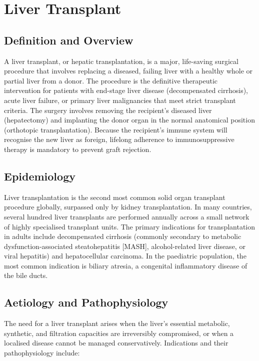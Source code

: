 \chapter{Liver Transplant}

\section*{Definition and Overview}
A liver transplant, or hepatic transplantation, is a major, life-saving surgical procedure that involves replacing a diseased, failing liver with a healthy whole or partial liver from a donor. The procedure is the definitive therapeutic intervention for patients with end-stage liver disease (decompensated cirrhosis), acute liver failure, or primary liver malignancies that meet strict transplant criteria. The surgery involves removing the recipient's diseased liver (hepatectomy) and implanting the donor organ in the normal anatomical position (orthotopic transplantation). Because the recipient's immune system will recognise the new liver as foreign, lifelong adherence to immunosuppressive therapy is mandatory to prevent graft rejection.

\section*{Epidemiology}
Liver transplantation is the second most common solid organ transplant procedure globally, surpassed only by kidney transplantation. In many countries, several hundred liver transplants are performed annually across a small network of highly specialised transplant units. The primary indications for transplantation in adults include decompensated cirrhosis (commonly secondary to metabolic dysfunction-associated steatohepatitis [MASH], alcohol-related liver disease, or viral hepatitis) and hepatocellular carcinoma. In the paediatric population, the most common indication is biliary atresia, a congenital inflammatory disease of the bile ducts.

\section*{Aetiology and Pathophysiology}
The need for a liver transplant arises when the liver's essential metabolic, synthetic, and filtration capacities are irreversibly compromised, or when a localised disease cannot be managed conservatively. Indications and their pathophysiology include:

